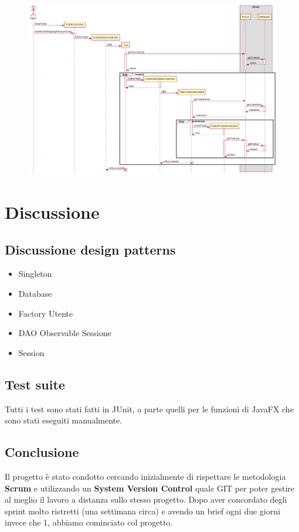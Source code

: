 \documentclass[12pt, a4paper]{report}
\begin{document}
\begin{figure}[H]
  \centering
  \includegraphics[width=\textwidth]{shopping_history_sequence.png}
\end{figure}

\chapter{Discussione}

\section{Discussione design patterns}

\begin{itemize}
  \item Singleton
  \item Database
  \item Factory Utente
  \item DAO Observable Sessione
  \item Session
\end{itemize}

\section{Test suite}

Tutti i test sono stati fatti in JUnit, a parte quelli per le funzioni di JavaFX
che sono stati eseguiti manualmente.


\section{Conclusione}
Il progetto è stato condotto cercando inizialmente di rispettare le metodologia
\textbf{Scrum} e utilizzando un \textbf{System Version Control} quale GIT per 
poter gestire al meglio il lavoro a distanza sullo stesso progetto. Dopo aver
concordato degli sprint molto ristretti (una settimana circa) e avendo un brief
ogni due giorni invece che 1, abbiamo cominciato col progetto.
\end{document}
